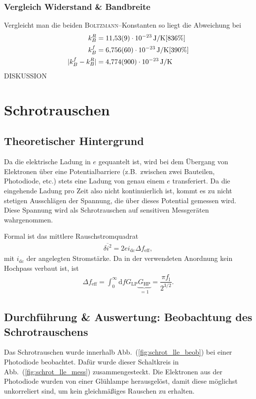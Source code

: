 \documentclass[sn-mathphys-num,iicol]{sn-jnl}
\theoremstyle{thmstyleone}
\theoremstyle{thmstyletwo}
\theoremstyle{thmstylethree}
\newcommand{\td}{\text{d}}
\begin{document}
\subsubsection{Vergleich Widerstand \& Bandbreite}
Vergleicht man die beiden \textsc{Boltzmann}--Konstanten so liegt die Abweichung bei
\begin{align}
	k_B^R         & =\SI{11.53+-0.09e-23}{J/K}[836\%] \\
	k_B^f         & =\SI{6.756+-0.06e-23}{J/K}[390\%] \\
	|k_B^f-k_B^R| & =\SI{4.774+-0.90e-23}{J/K}
\end{align}
DISKUSSION


\section{Schrotrauschen}
\subsection{Theoretischer Hintergrund}
Da die elektrische Ladung in $e$ gequantelt ist, wird bei dem Übergang von Elektronen über eine Potentialbarriere (z.B.\ zwischen zwei Bauteilen, Photodiode, etc.) stets eine Ladung von genau einem $e$ transferiert.
Da die eingehende Ladung pro Zeit also nicht kontinuierlich ist, kommt es zu nicht stetigen Ausschlägen der Spannung, die über dieses Potential gemessen wird.
Diese Spannung wird als Schrotrauschen auf sensitiven Messgeräten wahrgenommen.

Formal ist das mittlere Rauschstromquadrat
\begin{align}
	\overline{\delta i^2}=2ei_\text{dc}\Delta f_\text{eff}
	,\end{align}
mit $i_\text{dc}$ der angelegten Stromstärke.
Da in der verwendeten Anordnung kein Hochpass verbaut ist, ist 
\begin{align} 
  \Delta f_\text{eff}=\int_{0}^{\infty}\td fG_\text{LP}\underbrace{G_\text{HP}}_{=1}=\dfrac{\pi f_\text{l}}{2^{3/2}}
.\end{align}

\subsection{Durchführung \& Auswertung: Beobachtung des Schrotrauschens}
Das Schrotrauschen wurde innerhalb Abb.\ (\ref{fig:schrot_lle_beob}) bei einer Photodiode beobachtet.
Dafür wurde dieser Schaltkreis in Abb.\ (\ref{fig:schrot_lle_mess}) zusammengesteckt.
Die Elektronen aus der Photodiode wurden von einer Glühlampe herausgelöst, damit diese möglichst unkorreliert sind, um kein gleichmäßiges Rauschen zu erhalten.
\end{document}
